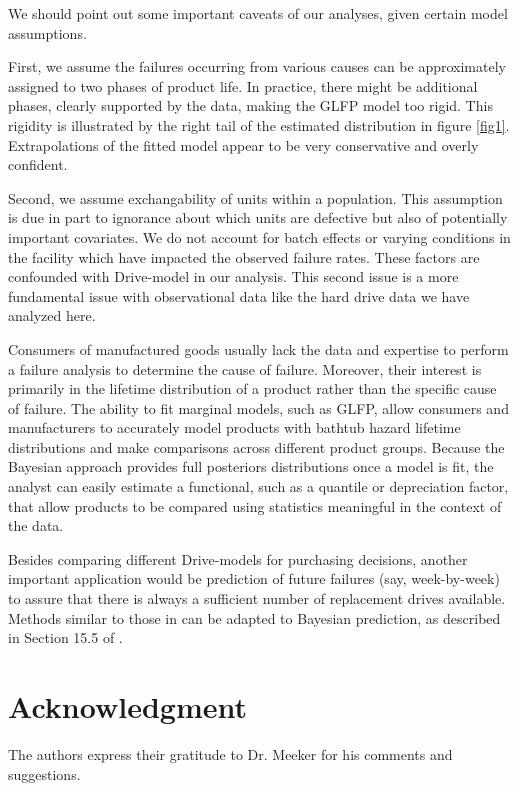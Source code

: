 \documentclass[12pt]{article}
\begin{document}
We should point out some important caveats of our analyses, given certain model assumptions. 

First, we assume the failures occurring from various causes can be approximately assigned to two phases of product life.  In practice, there might be additional phases, clearly supported by the data, making the GLFP model too rigid. This rigidity is illustrated by the right tail of the estimated distribution in figure \ref{fig1}. Extrapolations of the fitted model appear to be very conservative and overly confident.

Second, we assume exchangability of units within a population. This assumption is due in part to ignorance about which units are defective but also of potentially important covariates. We do not account for batch effects or varying conditions in the facility which have impacted the observed failure rates. These factors are confounded with Drive-model in our analysis. This second issue is a more fundamental issue with observational data like the hard drive data we have analyzed here.

Consumers of manufactured goods usually lack the data and expertise to perform a failure analysis to determine the cause of failure.  Moreover, their interest is primarily in the lifetime distribution of a product rather than the specific cause of failure.  The ability to fit marginal models, such as GLFP, allow consumers and manufacturers to accurately model products with bathtub hazard lifetime distributions and make comparisons across different product groups.  Because the Bayesian approach provides full posteriors distributions once a model is fit, the analyst can easily estimate a functional, such as a quantile or depreciation factor, that allow products to be compared using statistics meaningful in the context of the data. 

Besides comparing different Drive-models for purchasing decisions, another important application would be prediction of future failures (say, week-by-week) to assure that there is always a sufficient number of replacement drives available.  Methods similar to those in \cite{hmm} can be adapted to Bayesian prediction, as described in Section 15.5 of \cite{intervals}.
 
\section*{Acknowledgment}    
The authors express their gratitude to Dr. \hspace{-.5em} Meeker for his comments and suggestions.
\end{document}

